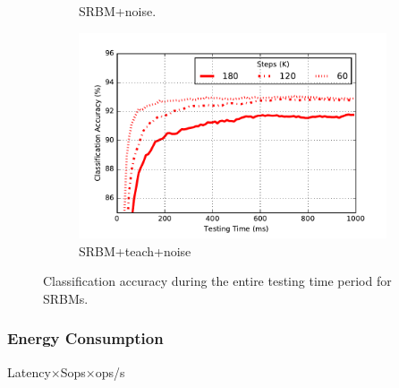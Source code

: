 \begin{figure}
\begin{subfigure}[t]{0.4\textwidth}
		\caption{SRBM+noise.}
	\end{subfigure}
	\begin{subfigure}[t]{0.4\textwidth}
		\includegraphics[width=\textwidth]{pics_sdlm/53_MNIST_SRBM_all/latency.pdf}
		\caption{SRBM+teach+noise}
	\end{subfigure}
	\caption{Classification accuracy during the entire testing time period for SRBMs.}
\end{figure}

\subsubsection{Energy Consumption}
Latency$\times$Sops$\times$ops/s

